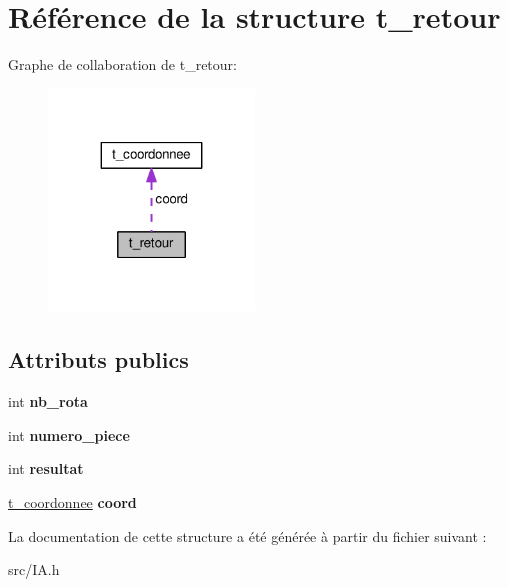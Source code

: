 \hypertarget{structt__retour}{}\section{Référence de la structure t\+\_\+retour}
\label{structt__retour}


Graphe de collaboration de t\+\_\+retour\+:
\nopagebreak
\begin{figure}[H]
\begin{center}
\leavevmode
\includegraphics[width=155pt]{structt__retour__coll__graph}
\end{center}
\end{figure}
\subsection*{Attributs publics}
\begin{DoxyCompactItemize}
\item 
int {\bfseries nb\+\_\+rota}\hypertarget{structt__retour_ac2dfc0d49085b9d3829d88c46aa77c9a}{}\label{structt__retour_ac2dfc0d49085b9d3829d88c46aa77c9a}

\item 
int {\bfseries numero\+\_\+piece}\hypertarget{structt__retour_a0ee215e1631303db2201bf7372404dfd}{}\label{structt__retour_a0ee215e1631303db2201bf7372404dfd}

\item 
int {\bfseries resultat}\hypertarget{structt__retour_aca09b7cea68fd1ac3e7f20a09ff2a120}{}\label{structt__retour_aca09b7cea68fd1ac3e7f20a09ff2a120}

\item 
\hyperlink{structt__coordonnee}{t\+\_\+coordonnee} {\bfseries coord}\hypertarget{structt__retour_a60b1dd770298477ab55ed70a6db8b673}{}\label{structt__retour_a60b1dd770298477ab55ed70a6db8b673}

\end{DoxyCompactItemize}


La documentation de cette structure a été générée à partir du fichier suivant \+:\begin{DoxyCompactItemize}
\item 
src/I\+A.\+h\end{DoxyCompactItemize}
